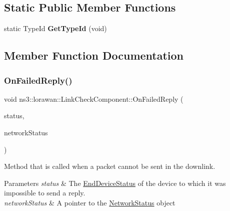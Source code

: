 \subsection*{Static Public Member Functions}
\begin{DoxyCompactItemize}
\item 
\mbox{\label{classns3_1_1lorawan_1_1LinkCheckComponent_a6727e8475d22e64e2d24ef9da30e41a3}} 
static Type\+Id {\bfseries Get\+Type\+Id} (void)
\end{DoxyCompactItemize}


\subsection{Member Function Documentation}
\mbox{\label{classns3_1_1lorawan_1_1LinkCheckComponent_a256519f7da4d9d512ac1c1ce6bde4c1a}} 
\subsubsection{\texorpdfstring{On\+Failed\+Reply()}{OnFailedReply()}}
{\footnotesize\ttfamily void ns3\+::lorawan\+::\+Link\+Check\+Component\+::\+On\+Failed\+Reply (\begin{DoxyParamCaption}\item[{Ptr$<$ \hyperlink{classns3_1_1lorawan_1_1EndDeviceStatus}{End\+Device\+Status} $>$}]{status,  }\item[{Ptr$<$ \hyperlink{classns3_1_1lorawan_1_1NetworkStatus}{Network\+Status} $>$}]{network\+Status }\end{DoxyParamCaption})\hspace{0.3cm}{\ttfamily [virtual]}}

Method that is called when a packet cannot be sent in the downlink.


\begin{DoxyParams}{Parameters}
{\em status} & The \hyperlink{classns3_1_1lorawan_1_1EndDeviceStatus}{End\+Device\+Status} of the device to which it was impossible to send a reply. \\
\hline
{\em network\+Status} & A pointer to the \hyperlink{classns3_1_1lorawan_1_1NetworkStatus}{Network\+Status} object \\
\hline
\end{DoxyParams}


